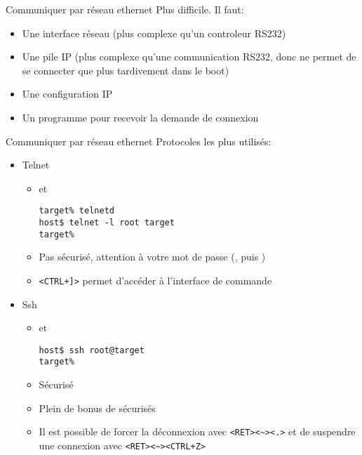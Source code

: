 \begin{frame}[fragile=singleslide]{Communiquer par réseau ethernet}
  Plus difficile. Il faut:
  \begin{itemize}
  \item Une interface réseau (plus complexe qu'un controleur RS232)
  \item Une pile IP (plus complexe qu'une communication RS232, donc ne
    permet de se connecter que plus tardivement dans le boot)
  \item Une configuration IP
  \item Un programme  pour recevoir la demande de connexion
  \end{itemize}
\end{frame}

\begin{frame}[fragile=singleslide]{Communiquer par réseau ethernet}
  Protocoles les plus utilisés:
  \begin{itemize}
  \item Telnet
    \begin{itemize}
    \item {} et 
      \begin{lstlisting}
target% telnetd
host$ telnet -l root target
target%
      \end{lstlisting} %
    \item   Pas   sécurisé,   attention   à   votre   mot   de   passe
      (, puis )
    \item \verb/<CTRL+]>/ permet d'accéder à l'interface de commande
    \end{itemize}
  \item Ssh
    \begin{itemize}
    \item {} et 
\begin{lstlisting}
host$ ssh root@target
target%
\end{lstlisting} %
    \item Sécurisé
    \item Plein de bonus de sécurisés
    \item   Il   est   possible   de  forcer   la   déconnexion   avec
      \verb/<RET><~><.>/   et   de   suspendre  une   connexion   avec
      \verb/<RET><~><CTRL+Z>/
    \end{itemize}
  \end{itemize}
\end{frame}

